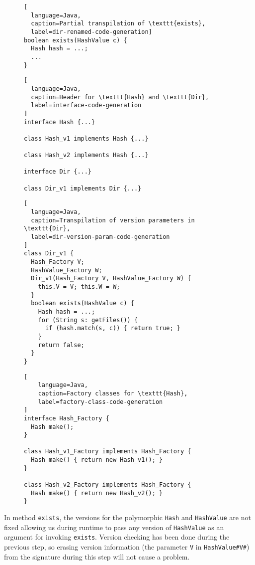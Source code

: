 \begin{figure}[h!]
\begin{lstlisting}[
  language=Java,
  caption=Partial transpilation of \texttt{exists},
  label=dir-renamed-code-generation]
boolean exists(HashValue c) {
  Hash hash = ...;
  ...
}
\end{lstlisting}

\begin{lstlisting}[
  language=Java,
  caption=Header for \texttt{Hash} and \texttt{Dir},
  label=interface-code-generation
]
interface Hash {...}

class Hash_v1 implements Hash {...}

class Hash_v2 implements Hash {...}

interface Dir {...}

class Dir_v1 implements Dir {...}
\end{lstlisting}

\begin{lstlisting}[
  language=Java,
  caption=Transpilation of version parameters in \texttt{Dir},
  label=dir-version-param-code-generation
]
class Dir_v1 {
  Hash_Factory V;
  HashValue_Factory W;
  Dir_v1(Hash_Factory V, HashValue_Factory W) {
    this.V = V; this.W = W;
  }
  boolean exists(HashValue c) {
    Hash hash = ...;
    for (String s: getFiles()) {
      if (hash.match(s, c)) { return true; }
    }
    return false;
  }
}
\end{lstlisting}

\begin{lstlisting}[
    language=Java,
    caption=Factory classes for \texttt{Hash},
    label=factory-class-code-generation
]
interface Hash_Factory {
  Hash make();
}

class Hash_v1_Factory implements Hash_Factory {
  Hash make() { return new Hash_v1(); }
}

class Hash_v2_Factory implements Hash_Factory {
  Hash make() { return new Hash_v2(); }
}
\end{lstlisting}
\end{figure}

In method \texttt{exists}, the versions for the polymorphic \texttt{Hash} and \texttt{HashValue} are not fixed 
allowing us during runtime to pass any version of \texttt{HashValue} as an argument for invoking \texttt{exists}. 
Version checking has been done during the previous step, so erasing version information 
(the parameter \texttt{V} in \texttt{HashValue\#V\#}) 
from the signature during this step will not cause a problem.

